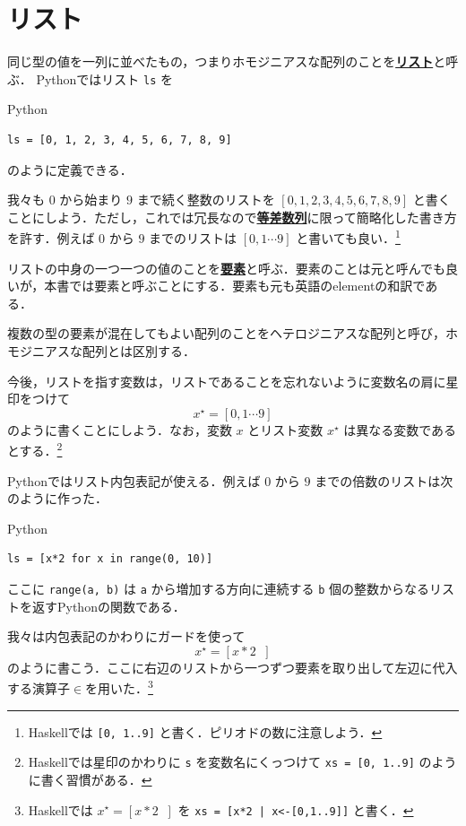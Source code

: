 \documentclass[a4paper,twocolumn]{jsbook}
\newcommand{\programminglanguage}[1]{\textsf{#1}}
\newcommand{\haskell}{\programminglanguage{Haskell}}
\newcommand{\python}{\programminglanguage{Python}}
\newcommand{\keyword}[1]{{\underline{\textbf{#1}}}}
\newcommand{\code}[1]{\texttt{#1}}
\newenvironment{pythoncode}{\begin{itembox}[r]{\python}}{\end{itembox}}
\DeclareMathOperator{\mFrom}{\in}
\newcommand{\mListWith}[1]{\left[#1\right]}
\newcommand{\mList}[1]{{#1}^\mathrm{\star}}
\newcommand{\mListGuard}[1]{\mathop{\mid_{#1}}}
\begin{document}
\section{リスト}

同じ型の値を一列に並べたもの，つまりホモジニアスな配列のことを\keyword{リスト}と呼ぶ．
\python ではリスト \code{ls} を
\begin{pythoncode}
\begin{verbatim}
ls = [0, 1, 2, 3, 4, 5, 6, 7, 8, 9]
\end{verbatim}
\end{pythoncode}
のように定義できる．

我々も $0$ から始まり $9$ まで続く整数のリストを $\mListWith{0,1,2,3,4,5,6,7,8,9}$ と書くことにしよう．ただし，これでは冗長なので\keyword{等差数列}に限って簡略化した書き方を許す．例えば $0$ から $9$ までのリストは $\mListWith{0,1\dotsb9}$ と書いても良い．\footnote{\haskell では \code{[0, 1..9]} と書く．ピリオドの数に注意しよう．}

リストの中身の一つ一つの値のことを\keyword{要素}と呼ぶ．要素のことは元と呼んでも良いが，本書では要素と呼ぶことにする．要素も元も英語のelementの和訳である．

複数の型の要素が混在してもよい配列のことをヘテロジニアスな配列と呼び，ホモジニアスな配列とは区別する．

今後，リストを指す変数は，リストであることを忘れないように変数名の肩に星印をつけて
\begin{equation}
\mList{x}=\mListWith{0,1\dotsb9}
\end{equation}
のように書くことにしよう．なお，変数 $x$ とリスト変数 $\mList{x}$ は異なる変数であるとする．\footnote{\haskell では星印のかわりに \code{s} を変数名にくっつけて \code{xs = [0, 1..9]} のように書く習慣がある．}

\python ではリスト内包表記が使える．例えば $0$ から $9$ までの倍数のリストは次のように作った．
\begin{pythoncode}
\begin{verbatim}
ls = [x*2 for x in range(0, 10)]
\end{verbatim}
\end{pythoncode}
ここに \code{range(a, b)} は \code{a} から増加する方向に連続する \code{b} 個の整数からなるリストを返す\python の関数である．

我々は内包表記のかわりにガードを使って
\begin{equation}
\mList{x}=\mListWith{x*2\mListGuard{x\mFrom{\mListWith{0,1\dotsb9}}}}
\end{equation}
のように書こう．ここに右辺のリストから一つずつ要素を取り出して左辺に代入する演算子$\mFrom$を用いた．\footnote{\haskell では $\mList{x}=\mListWith{x*2\mListGuard{x\mFrom{\mListWith{0,1\dotsb9}}}}$ を \code{xs = [x*2 | x<-[0,1..9]]} と書く．}
\end{document}
